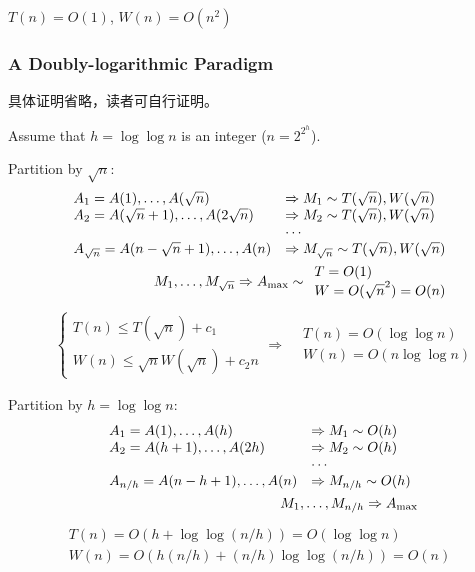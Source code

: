 \documentclass{article}
\begin{document}
$T(n)=O(1)$, $W(n)=O(n^2)$

\subsubsection{A Doubly-logarithmic Paradigm}
具体证明省略，读者可自行证明。

Assume that $h = \log \log n$ is an integer ($\displaystyle n=2^{2^h}$).

Partition by $\sqrt{n}$:{\small
\begin{align*}
    \begin{array}[pos]{ll}
        A_1=A(1),\dots,A(\sqrt{n})&\Rightarrow M_1 \sim T(\sqrt{n}), W(\sqrt{n})\\
        A_2=A(\sqrt{n}+1),\dots,A(2\sqrt{n})&\Rightarrow M_2 \sim T(\sqrt{n}), W(\sqrt{n})\\
        &\cdots \\
        A_{\sqrt{n}}=A(n-\sqrt{n}+1),\dots,A(n)&\Rightarrow M_{\sqrt{n}} \sim T(\sqrt{n}), W(\sqrt{n})
    \end{array}\\
    M_1,\dots,M_{\sqrt{n}}\Rightarrow A_{\max}\sim \begin{array}{l}
        T=O(1)\\
        W=O(\sqrt{n}^2)=O(n)
    \end{array}
\end{align*}}
\begin{align*}
    &\left\{\begin{array}{l}
        T(n)\le T(\sqrt{n})+c_1\\
        W(n)\le \sqrt{n}W(\sqrt{n})+c_2 n
    \end{array}\right.
    \Rightarrow&\begin{array}{l}
        T(n)=O(\log \log n)\\
        W(n)=O(n \log \log n)
    \end{array}
\end{align*}

Partition by $h = \log \log n$:{\small
\begin{align*}
    \begin{array}[pos]{ll}
        A_1=A(1),\dots,A(h)&\Rightarrow M_1 \sim  O(h)\\
        A_2=A(h+1),\dots,A(2h)&\Rightarrow M_2 \sim O(h)\\
        &\cdots \\
        A_{n/h}=A(n-h+1),\dots,A(n)&\Rightarrow M_{n/h} \sim O(h)
    \end{array}\\
    M_1,\dots,M_{n/h}\Rightarrow A_{\max}
\end{align*}}
\begin{align*}
    \begin{array}{l}
        T(n)=O(h+\log \log (n/h))=O(\log \log n)\\
        W(n)=O(h(n/h)+(n/h)\log\log(n/h))=O(n)
    \end{array}
\end{align*}
\end{document}
